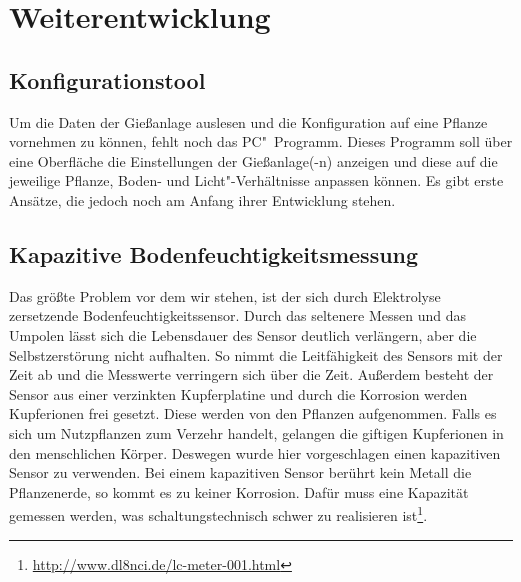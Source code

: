 
\section{Weiterentwicklung}

\subsection{Konfigurationstool}
Um die Daten der Gießanlage auslesen und die Konfiguration auf eine Pflanze vornehmen zu können, fehlt noch das PC"~Programm. 
Dieses Programm soll über eine Oberfläche die Einstellungen der Gießanlage(-n) anzeigen und diese auf die jeweilige Pflanze, Boden- und Licht"-Verhältnisse anpassen können.
Es gibt erste Ansätze, die jedoch noch am Anfang ihrer Entwicklung stehen.

\subsection{Kapazitive Bodenfeuchtigkeitsmessung}
Das größte Problem vor dem wir stehen, ist der sich durch Elektrolyse zersetzende Bodenfeuchtigkeitssensor.
Durch das seltenere Messen und das Umpolen lässt sich die Lebensdauer des Sensor deutlich verlängern, aber die Selbstzerstörung nicht aufhalten.
So nimmt die Leitfähigkeit des Sensors mit der Zeit ab und die Messwerte verringern sich über die Zeit.
Außerdem besteht der Sensor aus einer verzinkten Kupferplatine und durch die Korrosion werden Kupferionen frei gesetzt. 
Diese werden von den Pflanzen aufgenommen. Falls es sich um Nutzpflanzen zum Verzehr handelt, gelangen die giftigen Kupferionen in den menschlichen Körper.
Deswegen wurde hier vorgeschlagen einen kapazitiven Sensor zu verwenden. 
Bei einem kapazitiven Sensor berührt kein Metall die Pflanzenerde, so kommt es zu keiner Korrosion.
Dafür muss eine Kapazität gemessen werden, was schaltungstechnisch schwer zu realisieren ist\footnote{\href{http://www.dl8nci.de/lc-meter-001.html}{http://www.dl8nci.de/lc-meter-001.html}}.
 